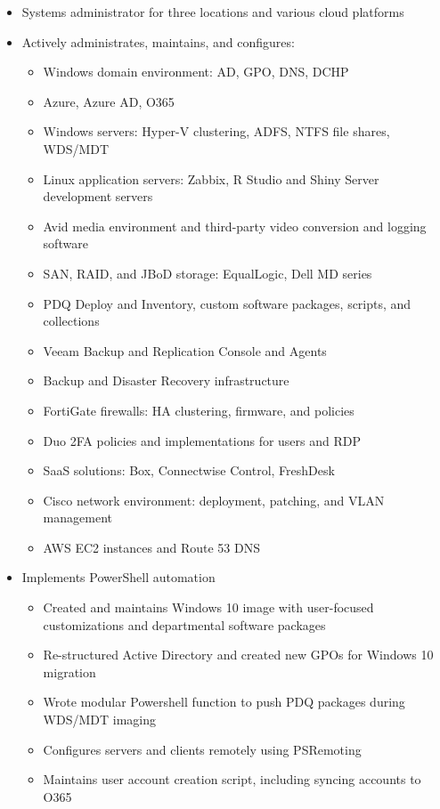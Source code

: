 \documentclass[centered]{res}
\begin{document}
\begin{resume}
\begin{itemize}
\item Systems administrator for three locations and various cloud platforms
\item Actively administrates, maintains, and configures:
	\begin{itemize}
		\item Windows domain environment: AD, GPO, DNS, DCHP
		\item Azure, Azure AD, O365 
		\item Windows servers: Hyper-V clustering, ADFS, NTFS file shares, WDS/MDT
		\item Linux application servers: Zabbix, R Studio and Shiny Server development servers
		\item Avid media environment and third-party video conversion and logging software
		\item SAN, RAID, and JBoD storage: EqualLogic, Dell MD series
		\item PDQ Deploy and Inventory, custom software packages, scripts, and collections
		\item Veeam Backup and Replication Console and Agents
		\item Backup and Disaster Recovery infrastructure
		\item FortiGate firewalls: HA clustering, firmware, and policies
		\item Duo 2FA policies and implementations for users and RDP
		\item SaaS solutions: Box, Connectwise Control, FreshDesk
		\item Cisco network environment: deployment, patching, and VLAN management		
		\item AWS EC2 instances and Route 53 DNS
	\end{itemize}
\item Implements PowerShell automation
	\begin{itemize}
	\item Created and maintains Windows 10 image with user-focused customizations and departmental software packages
	\item Re-structured Active Directory and created new GPOs for Windows 10 migration
	\item Wrote modular Powershell function to push PDQ packages during WDS/MDT imaging
	\item Configures servers and clients remotely using PSRemoting
	\item Maintains user account creation script, including syncing accounts to O365

\end{itemize}
\end{itemize}
\end{resume}
\end{document}
